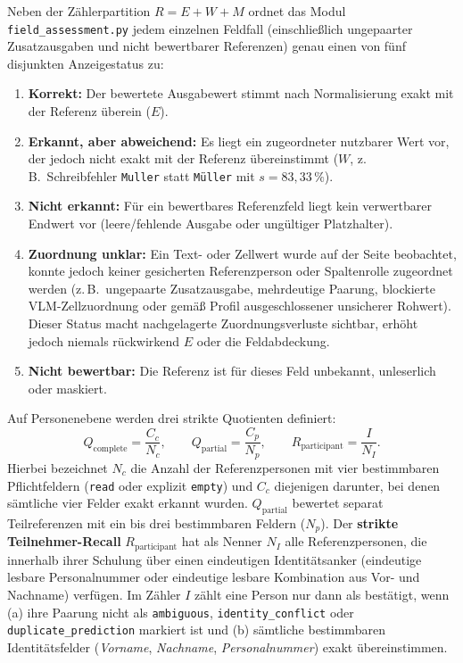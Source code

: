 Neben der Zählerpartition $R = E + W + M$ ordnet das Modul \texttt{field\_assessment.py} jedem einzelnen Feldfall (einschließlich ungepaarter Zusatzausgaben und nicht bewertbarer Referenzen) genau einen von fünf disjunkten Anzeigestatus zu:
\begin{enumerate}
  \item \textbf{Korrekt:} Der bewertete Ausgabewert stimmt nach Normalisierung exakt mit der Referenz überein ($E$).
  \item \textbf{Erkannt, aber abweichend:} Es liegt ein zugeordneter nutzbarer Wert vor, der jedoch nicht exakt mit der Referenz übereinstimmt ($W$, z.\,B.\ Schreibfehler \texttt{Muller} statt \texttt{Müller} mit $s = 83{,}33\,\%$).
  \item \textbf{Nicht erkannt:} Für ein bewertbares Referenzfeld liegt kein verwertbarer Endwert vor (leere/fehlende Ausgabe oder ungültiger Platzhalter).
  \item \textbf{Zuordnung unklar:} Ein Text- oder Zellwert wurde auf der Seite beobachtet, konnte jedoch keiner gesicherten Referenzperson oder Spaltenrolle zugeordnet werden (z.\,B.\ ungepaarte Zusatzausgabe, mehrdeutige Paarung, blockierte VLM-Zellzuordnung oder gemäß Profil ausgeschlossener unsicherer Rohwert). Dieser Status macht nachgelagerte Zuordnungsverluste sichtbar, erhöht jedoch niemals rückwirkend $E$ oder die Feldabdeckung.
  \item \textbf{Nicht bewertbar:} Die Referenz ist für dieses Feld unbekannt, unleserlich oder maskiert.
\end{enumerate}

Auf Personenebene werden drei strikte Quotienten definiert:
\begin{equation}
  Q_{\mathrm{complete}} = \frac{C_c}{N_c}, \qquad
  Q_{\mathrm{partial}} = \frac{C_p}{N_p}, \qquad
  R_{\mathrm{participant}} = \frac{I}{N_I}.
  \label{eq:participant-metrics}
\end{equation}
Hierbei bezeichnet $N_c$ die Anzahl der Referenzpersonen mit vier bestimmbaren Pflichtfeldern (\texttt{read} oder explizit \texttt{empty}) und $C_c$ diejenigen darunter, bei denen sämtliche vier Felder exakt erkannt wurden. $Q_{\mathrm{partial}}$ bewertet separat Teilreferenzen mit ein bis drei bestimmbaren Feldern ($N_p$). Der \textbf{strikte Teilnehmer-Recall} $R_{\mathrm{participant}}$ hat als Nenner $N_I$ alle Referenzpersonen, die innerhalb ihrer Schulung über einen eindeutigen Identitätsanker (eindeutige lesbare Personalnummer oder eindeutige lesbare Kombination aus Vor- und Nachname) verfügen. Im Zähler $I$ zählt eine Person nur dann als bestätigt, wenn (a) ihre Paarung nicht als \texttt{ambiguous}, \texttt{identity\_conflict} oder \texttt{duplicate\_prediction} markiert ist und (b) sämtliche bestimmbaren Identitätsfelder (\emph{Vorname}, \emph{Nachname}, \emph{Personalnummer}) exakt übereinstimmen.

